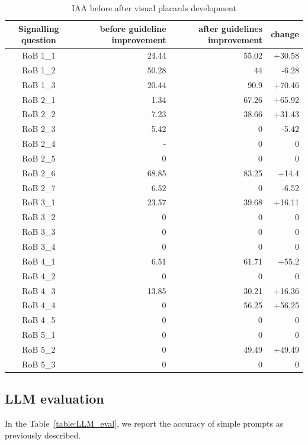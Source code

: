 \documentclass[sn-mathphys,Numbered]{sn-jnl}%
\theoremstyle{thmstyleone}%
\theoremstyle{thmstyletwo}%
\theoremstyle{thmstylethree}%
\begin{document}
\begin{table}[htb]
    \caption{IAA before after visual placards development}
    \label{tab:IAA_sq}
    \centering
    \begin{tabular}{crrr}
    \hline
        Signalling question & before guideline improvement & after guidelines improvement & change \\
    \hline
        RoB 1\_1 & 24.44 & 55.02 & +30.58 \\ 
        RoB 1\_2 & 50.28 & 44 & -6.28 \\ 
        RoB 1\_3 & 20.44 & 90.9 & +70.46 \\ 
        RoB 2\_1 & 1.34 & 67.26 & +65.92 \\ 
        RoB 2\_2 & 7.23 & 38.66 & +31.43 \\ 
        RoB 2\_3 & 5.42 & 0 & -5.42 \\ 
        RoB 2\_4 & - & 0 & 0 \\ 
        RoB 2\_5 & 0 & 0 & 0 \\ 
        RoB 2\_6 & 68.85 & 83.25 & +14.4 \\ 
        RoB 2\_7 & 6.52 & 0 & -6.52 \\ 
        RoB 3\_1 & 23.57 & 39.68 & +16.11 \\ 
        RoB 3\_2 & 0 & 0 & 0 \\ 
        RoB 3\_3 & 0 & 0 & 0 \\ 
        RoB 3\_4 & 0 & 0 & 0 \\ 
        RoB 4\_1 & 6.51 & 61.71 & +55.2 \\ 
        RoB 4\_2 & 0 & 0 & 0 \\ 
        RoB 4\_3 & 13.85 & 30.21 & +16.36 \\ 
        RoB 4\_4 & 0 & 56.25 & +56.25 \\ 
        RoB 4\_5 & 0 & 0 & 0 \\ 
        RoB 5\_1 & 0 & 0 & 0 \\ 
        RoB 5\_2 & 0 & 49.49 & +49.49 \\ 
        RoB 5\_3 & 0 & 0 & 0 \\ \hline
    \end{tabular}
\end{table}
%
%
%
\subsection{LLM evaluation}
%
In the Table~\ref{table:LLM_eval}, we report the accuracy of simple prompts as previously described. 
\end{document}
